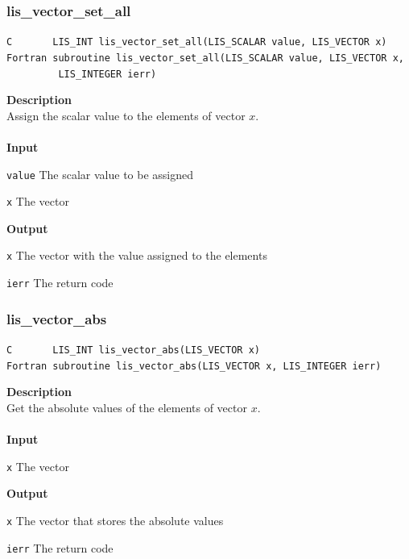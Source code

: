 \documentclass[a4paper]{article}
\newcommand{\namelistlabel}[1]{\mbox{#1}\hfill}
\newenvironment{namelist}[1]{%
\begin{list}{}
  {\let\makelabel\namelistlabel
  \settowidth{\labelwidth}{#1}
  \setlength{\leftmargin}{1.1\labelwidth}}
  }{%
\end{list}}
\begin{document}
\newpage
\subsubsection{lis\_vector\_set\_all}
\begin{screen}
\verb|C       LIS_INT lis_vector_set_all(LIS_SCALAR value, LIS_VECTOR x)|
\verb|Fortran subroutine lis_vector_set_all(LIS_SCALAR value, LIS_VECTOR x,|\\
\verb|         LIS_INTEGER ierr)|
\end{screen}
{\bf Description}\\
\indent
Assign the scalar value to the elements of vector $x$.
\\ \\
\noindent
{\bf Input}
\begin{namelist}{XXXXXXXXXXXXXXXXXXXX}
\item[\tt value] The scalar value to be assigned
\item[\tt x] The vector
\end{namelist}
{\bf Output}
\begin{namelist}{XXXXXXXXXXXXXXXXXXXX}
\item[\tt x] The vector with the value assigned to the elements
\item[\tt ierr] The return code
\end{namelist}

\subsubsection{lis\_vector\_abs}
\begin{screen}
\verb|C       LIS_INT lis_vector_abs(LIS_VECTOR x)|\\
\verb|Fortran subroutine lis_vector_abs(LIS_VECTOR x, LIS_INTEGER ierr)|
\end{screen}
{\bf Description}\\
\indent
Get the absolute values of the elements of vector $x$.
\\ \\
\noindent
{\bf Input}
\begin{namelist}{XXXXXXXXXXXXXXXXXXXX}
\item[\tt x] The vector
\end{namelist}
{\bf Output}
\begin{namelist}{XXXXXXXXXXXXXXXXXXXX}
\item[\tt x] The vector that stores the absolute values
\item[\tt ierr] The return code
\end{namelist}
\end{document}
